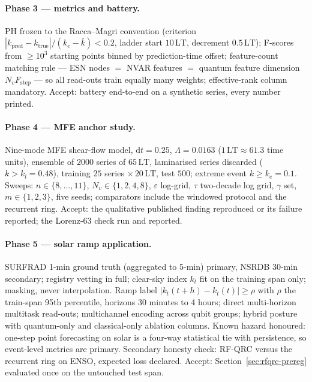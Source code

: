 \paragraph{Phase 3 --- metrics and battery.} PH frozen to the
Racca--Magri convention (criterion
$|k_{\mathrm{pred}}-k_{\mathrm{true}}|/(k_e-\bar k)<0.2$, ladder start
$10\,\mathrm{LT}$, decrement $0.5\,\mathrm{LT}$); F-scores from
$\ge10^3$ starting points binned by prediction-time offset; feature-count
matching rule --- ESN nodes $=$ NVAR features $=$ quantum feature dimension
$N_v F_{\mathrm{step}}$ --- so all read-outs train equally many weights;
effective-rank column mandatory. Accept: battery end-to-end on a synthetic
series, every number printed.

\paragraph{Phase 4 --- MFE anchor study.} Nine-mode MFE shear-flow model,
$\mathrm{d}t=0.25$, $\Lambda=0.0163$ ($1\,\mathrm{LT}\approx61.3$ time
units), ensemble of $2000$ series of $65\,\mathrm{LT}$, laminarised series
discarded ($k>k_l=0.48$), training $25$ series $\times\,20\,\mathrm{LT}$,
test $500$; extreme event $k\ge k_e=0.1$. Sweeps: $n\in\{8,\dots,11\}$,
$N_v\in\{1,2,4,8\}$, $\varepsilon$ log-grid, $\tau$ two-decade log grid,
$\gamma$ set, $m\in\{1,2,3\}$, five seeds; comparators include the
windowed protocol and the recurrent ring. Accept: the qualitative
published finding reproduced or its failure reported; the Lorenz-63 check
run and reported.

\paragraph{Phase 5 --- solar ramp application.} SURFRAD 1-min ground truth
(aggregated to 5-min) primary, NSRDB 30-min secondary; registry vetting in
full; clear-sky index $k_t$ fit on the training span only; masking, never
interpolation. Ramp label $|k_t(t{+}h)-k_t(t)|\ge\rho$ with $\rho$ the
train-span 95th percentile, horizons 30 minutes to 4 hours; direct
multi-horizon multitask read-outs; multichannel encoding across qubit
groups; hybrid posture with quantum-only and classical-only ablation
columns. Known hazard honoured: one-step point forecasting on solar is a
four-way statistical tie with persistence, so event-level metrics are
primary. Secondary honesty check: RF-QRC versus the recurrent ring on ENSO,
expected loss declared. Accept: Section~\ref{sec:rfqrc-prereg} evaluated
once on the untouched test span.

